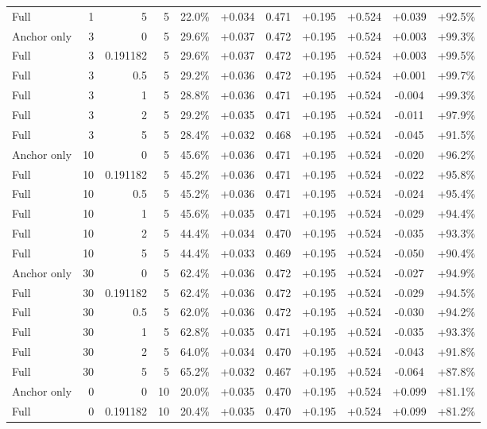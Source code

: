 \begin{table}[htbp]
\begin{tabular}{lrrrccccccc}
Full & 1 & 5 & 5 & 22.0\% & +0.034 & 0.471 & +0.195 & +0.524 & +0.039 & +92.5\% \\
Anchor only & 3 & 0 & 5 & 29.6\% & +0.037 & 0.472 & +0.195 & +0.524 & +0.003 & +99.3\% \\
Full & 3 & 0.191182 & 5 & 29.6\% & +0.037 & 0.472 & +0.195 & +0.524 & +0.003 & +99.5\% \\
Full & 3 & 0.5 & 5 & 29.2\% & +0.036 & 0.472 & +0.195 & +0.524 & +0.001 & +99.7\% \\
Full & 3 & 1 & 5 & 28.8\% & +0.036 & 0.471 & +0.195 & +0.524 & -0.004 & +99.3\% \\
Full & 3 & 2 & 5 & 29.2\% & +0.035 & 0.471 & +0.195 & +0.524 & -0.011 & +97.9\% \\
Full & 3 & 5 & 5 & 28.4\% & +0.032 & 0.468 & +0.195 & +0.524 & -0.045 & +91.5\% \\
Anchor only & 10 & 0 & 5 & 45.6\% & +0.036 & 0.471 & +0.195 & +0.524 & -0.020 & +96.2\% \\
Full & 10 & 0.191182 & 5 & 45.2\% & +0.036 & 0.471 & +0.195 & +0.524 & -0.022 & +95.8\% \\
Full & 10 & 0.5 & 5 & 45.2\% & +0.036 & 0.471 & +0.195 & +0.524 & -0.024 & +95.4\% \\
Full & 10 & 1 & 5 & 45.6\% & +0.035 & 0.471 & +0.195 & +0.524 & -0.029 & +94.4\% \\
Full & 10 & 2 & 5 & 44.4\% & +0.034 & 0.470 & +0.195 & +0.524 & -0.035 & +93.3\% \\
Full & 10 & 5 & 5 & 44.4\% & +0.033 & 0.469 & +0.195 & +0.524 & -0.050 & +90.4\% \\
Anchor only & 30 & 0 & 5 & 62.4\% & +0.036 & 0.472 & +0.195 & +0.524 & -0.027 & +94.9\% \\
Full & 30 & 0.191182 & 5 & 62.4\% & +0.036 & 0.472 & +0.195 & +0.524 & -0.029 & +94.5\% \\
Full & 30 & 0.5 & 5 & 62.0\% & +0.036 & 0.472 & +0.195 & +0.524 & -0.030 & +94.2\% \\
Full & 30 & 1 & 5 & 62.8\% & +0.035 & 0.471 & +0.195 & +0.524 & -0.035 & +93.3\% \\
Full & 30 & 2 & 5 & 64.0\% & +0.034 & 0.470 & +0.195 & +0.524 & -0.043 & +91.8\% \\
Full & 30 & 5 & 5 & 65.2\% & +0.032 & 0.467 & +0.195 & +0.524 & -0.064 & +87.8\% \\
Anchor only & 0 & 0 & 10 & 20.0\% & +0.035 & 0.470 & +0.195 & +0.524 & +0.099 & +81.1\% \\
Full & 0 & 0.191182 & 10 & 20.4\% & +0.035 & 0.470 & +0.195 & +0.524 & +0.099 & +81.2\% \\

\end{tabular}
\end{table}
